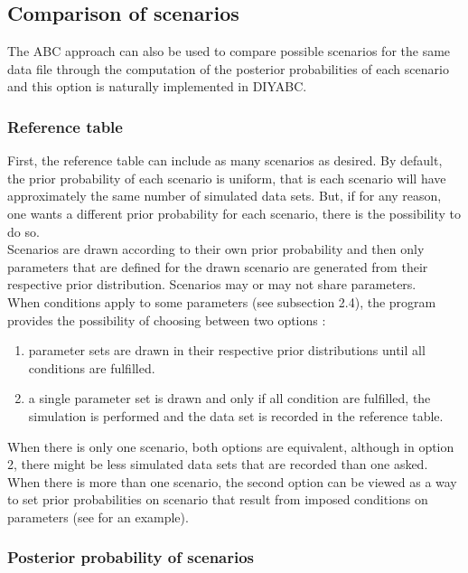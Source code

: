 \subsection{Comparison of scenarios}

The ABC approach can also be used to compare possible scenarios for
the same data file through the computation of the posterior probabilities
of each scenario and this option is naturally implemented in DIYABC.\\



\subsubsection{Reference table}

First, the reference table can include as many scenarios as desired.
By default, the prior probability of each scenario is uniform, that
is each scenario will have approximately the same number of simulated
data sets. But, if for any reason, one wants a different prior probability
for each scenario, there is the possibility to do so.\\


Scenarios are drawn according to their own prior probability and then
only parameters that are defined for the drawn scenario are generated
from their respective prior distribution. Scenarios may or may not
share parameters.\\
 When conditions apply to some parameters (see subsection 2.4), the
program provides the possibility of choosing between two options :
\begin{enumerate}
\item parameter sets are drawn in their respective prior distributions until
all conditions are fulfilled.
\item a single parameter set is drawn and only if all condition are fulfilled,
the simulation is performed and the data set is recorded in the reference
table.
\end{enumerate}
When there is only one scenario, both options are equivalent, although
in option 2, there might be less simulated data sets that are recorded
than one asked. When there is more than one scenario, the second option
can be viewed as a way to set prior probabilities on scenario that
result from imposed conditions on parameters (see \citet{ME2005}
for an example).


\subsubsection{Posterior probability of scenarios}

